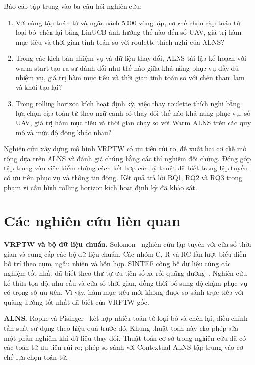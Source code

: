 \documentclass[11pt,a4paper]{article}
\begin{document}
Báo cáo tập trung vào ba câu hỏi nghiên cứu:
\begin{enumerate}[label=\textbf{RQ\arabic*.}]
\item Với cùng tập toán tử và ngân sách 5\,000 vòng lặp, cơ chế chọn cặp toán tử loại bỏ--chèn lại bằng LinUCB ảnh hưởng thế nào đến số UAV, giá trị hàm mục tiêu và thời gian tính toán so với roulette thích nghi của ALNS?
\item Trong các kịch bản nhiệm vụ và dữ liệu thay đổi, ALNS tái lập kế hoạch với warm start tạo ra sự đánh đổi như thế nào giữa khả năng phục vụ đầy đủ nhiệm vụ, giá trị hàm mục tiêu và thời gian tính toán so với chèn tham lam và khởi tạo lại?
\item Trong rolling horizon kích hoạt định kỳ, việc thay roulette thích nghi bằng lựa chọn cặp toán tử theo ngữ cảnh có thay đổi thế nào khả năng phục vụ, số UAV, giá trị hàm mục tiêu và thời gian chạy so với Warm ALNS trên các quy mô và mức độ động khác nhau?
\end{enumerate}

Nghiên cứu xây dựng mô hình VRPTW có ưu tiên rủi ro, đề xuất hai cơ chế mở rộng dựa trên ALNS và đánh giá chúng bằng các thí nghiệm đối chứng. Đóng góp tập trung vào việc kiểm chứng cách kết hợp các kỹ thuật đã biết trong lập tuyến có ưu tiên phục vụ và thông tin động. Kết quả trả lời RQ1, RQ2 và RQ3 trong phạm vi cấu hình rolling horizon kích hoạt định kỳ đã khảo sát.

\section{Các nghiên cứu liên quan}
\textbf{VRPTW và bộ dữ liệu chuẩn.} Solomon~\cite{solomon} nghiên cứu lập tuyến với cửa sổ thời gian và cung cấp các bộ dữ liệu chuẩn. Các nhóm C, R và RC lần lượt biểu diễn bố trí theo cụm, ngẫu nhiên và hỗn hợp. SINTEF công bố dữ liệu cùng các nghiệm tốt nhất đã biết theo thứ tự ưu tiên số xe rồi quãng đường~\cite{sintef}. Nghiên cứu kế thừa tọa độ, nhu cầu và cửa sổ thời gian, đồng thời bổ sung độ chậm phục vụ có trọng số ưu tiên. Vì vậy, hàm mục tiêu mới không được so sánh trực tiếp với quãng đường tốt nhất đã biết của VRPTW gốc.

\textbf{ALNS.} Ropke và Pisinger~\cite{alns} kết hợp nhiều toán tử loại bỏ và chèn lại, điều chỉnh tần suất sử dụng theo hiệu quả trước đó. Khung thuật toán này cho phép sửa một phần nghiệm khi dữ liệu thay đổi. Thuật toán cơ sở trong nghiên cứu đã có các toán tử ưu tiên rủi ro; phép so sánh với Contextual ALNS tập trung vào cơ chế lựa chọn toán tử.
\end{document}
